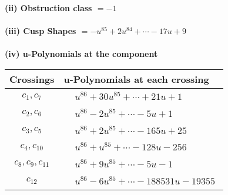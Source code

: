 \documentclass[1p]{elsarticle_modified}
\theoremstyle{definition}
\begin{document}
\flushleft \textbf{(ii) Obstruction class $= -1$}\\~\\
\flushleft \textbf{(iii) Cusp Shapes $= - u^{85}+2 u^{84}+\cdots-17 u+9$}\\~\\
\newpage\renewcommand{\arraystretch}{1}
\flushleft \textbf{(iv) u-Polynomials at the component}\newline \\
\begin{tabular}{m{50pt}|m{274pt}}
Crossings & \hspace{64pt}u-Polynomials at each crossing \\
\hline $$\begin{aligned}c_{1},c_{7}\end{aligned}$$&$\begin{aligned}
&u^{86}+30 u^{85}+\cdots+21 u+1
\end{aligned}$\\
\hline $$\begin{aligned}c_{2},c_{6}\end{aligned}$$&$\begin{aligned}
&u^{86}-2 u^{85}+\cdots-5 u+1
\end{aligned}$\\
\hline $$\begin{aligned}c_{3},c_{5}\end{aligned}$$&$\begin{aligned}
&u^{86}+2 u^{85}+\cdots-165 u+25
\end{aligned}$\\
\hline $$\begin{aligned}c_{4},c_{10}\end{aligned}$$&$\begin{aligned}
&u^{86}+u^{85}+\cdots-128 u-256
\end{aligned}$\\
\hline $$\begin{aligned}c_{8},c_{9},c_{11}\end{aligned}$$&$\begin{aligned}
&u^{86}+9 u^{85}+\cdots-5 u-1
\end{aligned}$\\
\hline $$\begin{aligned}c_{12}\end{aligned}$$&$\begin{aligned}
&u^{86}-6 u^{85}+\cdots-188531 u-19355
\end{aligned}$\\
\hline
\end{tabular}\\~\\
\end{document}
